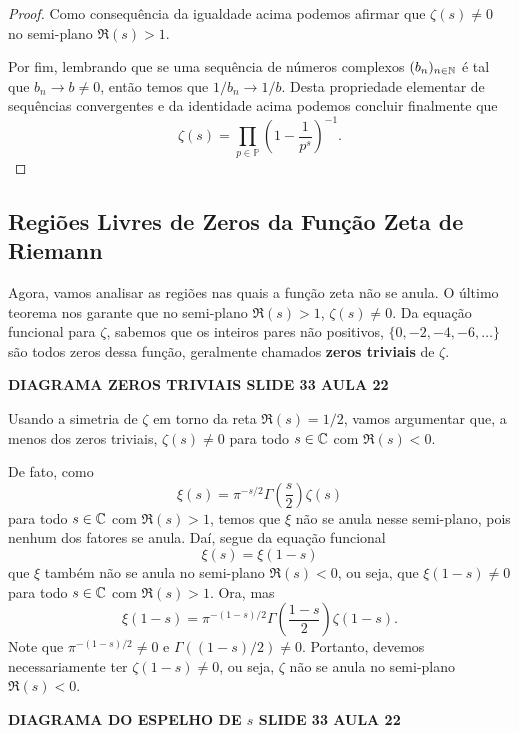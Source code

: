 \begin{proof}
        Como consequência da igualdade acima podemos afirmar que $\zeta(s)\neq 0$ no semi-plano
        $\Re(s) > 1$. 
        
        
        Por fim, lembrando que se uma sequência
        de números complexos $(b_n)_{n\in\mathbb{N}}$ 
        é tal que $b_n\to b\neq 0$,
        então temos que $1/b_n \to 1/b$. 
        Desta propriedade elementar de sequências convergentes e da identidade acima podemos concluir finalmente que 
        \[
        \zeta(s) 
        = \prod_{p\in\mathbb{P}} \left(1 - \frac{1}{p^s}\right)^{-1}.
        \]
    \end{proof}
    
    \subsection{Regiões Livres de Zeros da Função Zeta de Riemann}
    
    Agora, vamos analisar as regiões nas quais a função zeta não se anula.
    O último teorema nos garante que no semi-plano $\Re(s)>1$, $\zeta(s) \neq 0$.
    Da equação funcional para $\zeta$, sabemos que os inteiros pares não positivos,
    $\{0, -2, -4, -6, \dots\}$ são todos zeros dessa função, geralmente chamados
    \textbf{zeros triviais} de $\zeta$.
    \begin{center}
        {\bf DIAGRAMA ZEROS TRIVIAIS SLIDE 33 AULA 22}
    \end{center}
    Usando a simetria de $\zeta$ em torno da reta $\Re(s) = 1/2$, vamos argumentar que,
    a menos dos zeros triviais, $\zeta(s)\neq 0$ para todo $s\in\mathbb{C}$ com $\Re(s)<0$.
    
    De fato, como
    \[
    \xi(s) = \pi^{-s/2}\Gamma\left(\frac{s}{2}\right)\zeta(s)
    \]
    para todo $s\in\mathbb{C}$ com $\Re(s)>1$, temos que $\xi$ não se anula nesse semi-plano,
    pois nenhum dos fatores se anula. Daí, segue da equação funcional
    \[
    \xi(s) = \xi(1-s)
    \]
    que $\xi$ também não se anula no semi-plano $\Re(s) < 0$, ou seja, que $\xi(1-s)\neq 0$
    para todo $s\in\mathbb{C}$ com $\Re(s)>1$. Ora, mas
    \[
    \xi(1-s) = \pi^{-(1-s)/2}\Gamma\left(\frac{1-s}{2}\right)\zeta(1-s).
    \]
    Note que $\pi^{-(1-s)/2}\neq 0$ e $\Gamma((1-s)/2)\neq 0$. Portanto, devemos
    necessariamente ter $\zeta(1-s)\neq 0$, ou seja, $\zeta$ não se anula no
    semi-plano $\Re(s) < 0$.
    \begin{center}
        {\bf DIAGRAMA DO ESPELHO DE $s$ SLIDE 33 AULA 22}
    \end{center}
    \begin{center}
        
    \end{center}
    
